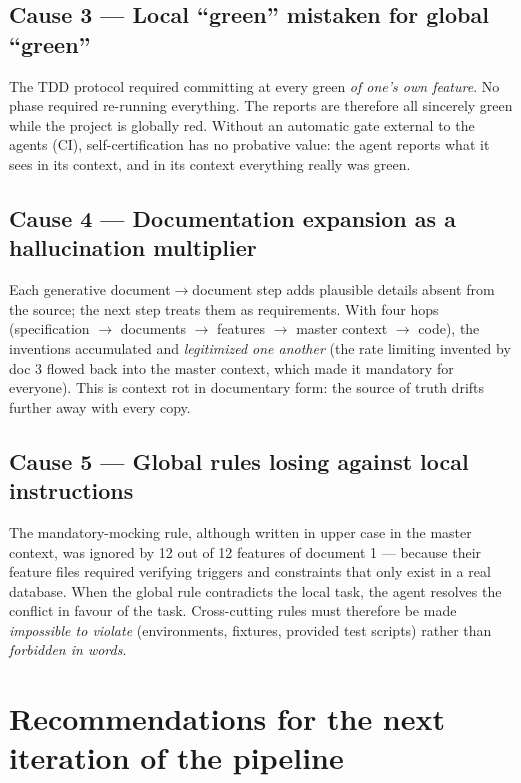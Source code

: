\documentclass[11pt,a4paper]{article}
\begin{document}
\subsection{Cause 3 --- Local ``green'' mistaken for global ``green''}
The TDD protocol required committing at every green \emph{of one's own feature}. No phase required re-running everything. The reports are therefore all sincerely green while the project is globally red. Without an automatic gate external to the agents (CI), self-certification has no probative value: the agent reports what it sees in its context, and in its context everything really was green.

\subsection{Cause 4 --- Documentation expansion as a hallucination multiplier}
Each generative document$\to$document step adds plausible details absent from the source; the next step treats them as requirements. With four hops (specification $\to$ documents $\to$ features $\to$ master context $\to$ code), the inventions accumulated and \emph{legitimized one another} (the rate limiting invented by doc 3 flowed back into the master context, which made it mandatory for everyone). This is context rot in documentary form: the source of truth drifts further away with every copy.

\subsection{Cause 5 --- Global rules losing against local instructions}
The mandatory-mocking rule, although written in upper case in the master context, was ignored by 12 out of 12 features of document 1 --- because their feature files required verifying triggers and constraints that only exist in a real database. When the global rule contradicts the local task, the agent resolves the conflict in favour of the task. Cross-cutting rules must therefore be made \emph{impossible to violate} (environments, fixtures, provided test scripts) rather than \emph{forbidden in words}.

\section{Recommendations for the next iteration of the pipeline}
\end{document}
